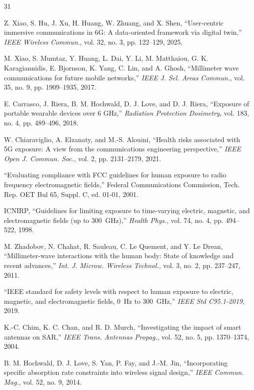 \documentclass[journal]{IEEEtran}
\begin{document}
\begin{thebibliography}{31}

Z. Xiao, S. Hu, J. Xu, H. Huang, W. Zhuang, and X. Shen, ``User-centric immersive communications in 6G: A data-oriented framework via digital twin,'' \emph{IEEE Wireless Commun.}, vol. 32, no. 3, pp. 122--129, 2025.

M. Xiao, S. Mumtaz, Y. Huang, L. Dai, Y. Li, M. Matthaiou, G. K. Karagiannidis, E. Bjornson, K. Yang, C. Lin, and A. Ghosh, ``Millimeter wave communications for future mobile networks,'' \emph{IEEE J. Sel. Areas Commun.}, vol. 35, no. 9, pp. 1909--1935, 2017.

E. Carrasco, J. Riera, B. M. Hochwald, D. J. Love, and D. J. Riera, ``Exposure of portable wearable devices over 6 GHz,'' \emph{Radiation Protection Dosimetry}, vol. 183, no. 4, pp. 489--496, 2018.

W. Chiaraviglio, A. Elzanaty, and M.-S. Alouini, ``Health risks associated with 5G exposure: A view from the communications engineering perspective,'' \emph{IEEE Open J. Commun. Soc.}, vol. 2, pp. 2131--2179, 2021.

``Evaluating compliance with FCC guidelines for human exposure to radio frequency electromagnetic fields,'' Federal Communications Commission, Tech. Rep. OET Bul 65, Suppl. C, ed. 01-01, 2001.

ICNIRP, ``Guidelines for limiting exposure to time-varying electric, magnetic, and electromagnetic fields (up to 300~GHz),'' \emph{Health Phys.}, vol. 74, no. 4, pp. 494--522, 1998.

M. Zhadobov, N. Chahat, R. Sauleau, C. Le Quement, and Y. Le Drean, ``Millimeter-wave interactions with the human body: State of knowledge and recent advances,'' \emph{Int. J. Microw. Wireless Technol.}, vol. 3, no. 2, pp. 237--247, 2011.

``IEEE standard for safety levels with respect to human exposure to electric, magnetic, and electromagnetic fields, 0~Hz to 300~GHz,'' \emph{IEEE Std C95.1-2019}, 2019.

K.-C. Chim, K. C. Chan, and R. D. Murch, ``Investigating the impact of smart antennas on SAR,'' \emph{IEEE Trans. Antennas Propag.}, vol. 52, no. 5, pp. 1370--1374, 2004.

B. M. Hochwald, D. J. Love, S. Yan, P. Fay, and J.-M. Jin, ``Incorporating specific absorption rate constraints into wireless signal design,'' \emph{IEEE Commun. Mag.}, vol. 52, no. 9, 2014.


\end{thebibliography}
\end{document}
